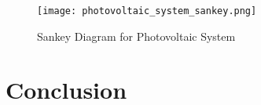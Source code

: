 \begin{figure}[h]
    \texttt{[image: photovoltaic\_system\_sankey.png]}
    \caption{Sankey Diagram for Photovoltaic System}
    \label{fig:photovoltaic_system_sankey}
\end{figure}



\section{Conclusion}\label{sec:optimizing_pv_systems_conclusion}


